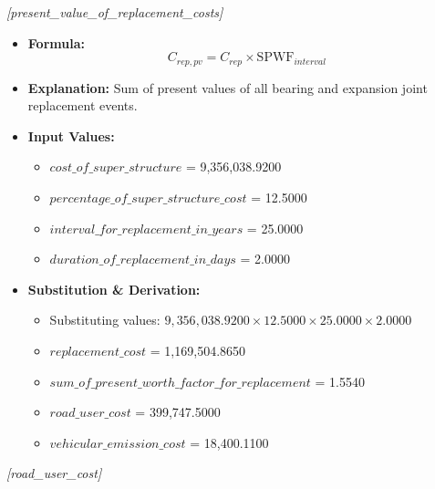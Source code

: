 \documentclass[12pt,a4paper]{article}
\begin{document}
\textit{[present\_value\_of\_replacement\_costs]}

\begin{itemize}
  \item \textbf{Formula:} $$C_{rep,pv} = C_{rep} \times \text{SPWF}_{interval}$$
  \item \textbf{Explanation:} Sum of present values of all bearing and expansion joint replacement events.
  \item \textbf{Input Values:}
  \begin{itemize}
    \item $cost\_of\_super\_structure$ = 9,356,038.9200
    \item $percentage\_of\_super\_structure\_cost$ = 12.5000
    \item $interval\_for\_replacement\_in\_years$ = 25.0000
    \item $duration\_of\_replacement\_in\_days$ = 2.0000
  \end{itemize}
  \item \textbf{Substitution \& Derivation:}
  \begin{itemize}
    \item Substituting values: $9,356,038.9200 \times 12.5000 \times 25.0000 \times 2.0000$
    \item $replacement\_cost$ = 1,169,504.8650
    \item $sum\_of\_present\_worth\_factor\_for\_replacement$ = 1.5540
    \item $road\_user\_cost$ = 399,747.5000
    \item $vehicular\_emission\_cost$ = 18,400.1100
  \end{itemize}
\end{itemize}


\textit{[road\_user\_cost]}
\end{document}

